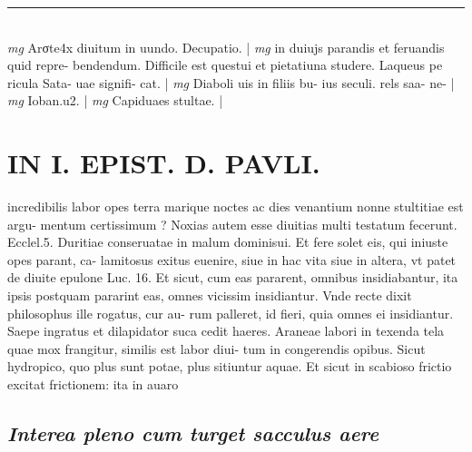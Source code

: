 \documentclass{article}
\begin{document}
\begin{pages}
\vspace{0.5cm}\noindent
\vspace{0.2cm}\rule{1cm}{0.2pt}\\ 
\hspace{0.2cm}\textit{mg}
\footnotesize Arσte4x diuitum in uundo. Decupatio. 
\normalsize| 
\hspace{0.2cm}\textit{mg}
\footnotesize in duiujs parandis et feruandis quid repre- bendendum. Difficile est questui et pietatiuna studere. Laqueus pe ricula Sata- uae signifi- cat. 
\normalsize| 
\hspace{0.2cm}\textit{mg}
\footnotesize Diaboli uis in filiis bu- ius seculi. rels saa- ne- 
\normalsize| 
\hspace{0.2cm}\textit{mg}
\footnotesize Ioban.u2. 
\normalsize| 
\hspace{0.2cm}\textit{mg}
\footnotesize Capiduaes stultae. 
\normalsize| 
\section*{IN I. EPIST. D. PAVLI. }
\marginpar{[ p.126 ]}\pstart incredibilis labor opes terra marique noctes ac dies venantium nonne stultitiae est argu- mentum certissimum ? Noxias autem esse diuitias multi testatum fecerunt. Ecclel.5. Duritiae conseruatae in malum dominisui. Et fere solet eis, qui iniuste opes parant, ca- lamitosus exitus euenire, siue in hac vita siue in altera, vt patet de diuite epulone Luc. 16. Et sicut, cum eas pararent, omnibus insidiabantur, ita ipsis postquam pararint eas, omnes vicissim insidiantur. Vnde recte dixit philosophus ille rogatus, cur au- rum palleret, id fieri, quia omnes ei insidiantur. Saepe ingratus et dilapidator suca cedit haeres. Araneae labori in texenda tela quae mox frangitur, similis est labor diui- tum in congerendis opibus. Sicut hydropico, quo plus sunt potae, plus sitiuntur aquae. Et sicut in scabioso frictio excitat frictionem: ita in auaro  \pend
{}
{}
\subsection*{\textit{Interea pleno cum turget sacculus aere }}
{}

\end{pages}
\end{document}
